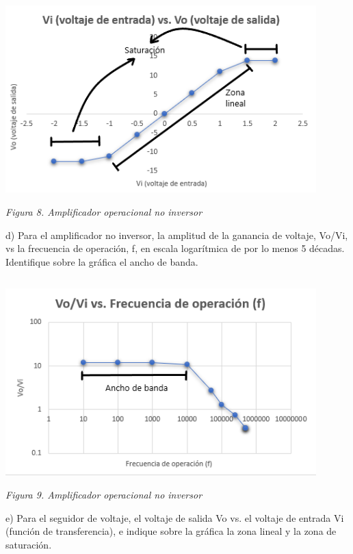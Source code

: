 \documentclass[12pt]{article}
\begin{document}
	\begin{center}
		\includegraphics[width=12cm,height=8cm]{Img/graf3}\\
		\textit{Figura 8. Amplificador operacional no inversor}\\
	\end{center}
	
	d) Para el amplificador no inversor, la amplitud de la ganancia de voltaje, Vo/Vi, vs la frecuencia de operación, f, en escala logarítmica de por lo menos 5 décadas. Identifique sobre la gráfica el ancho de banda.\\
	
	\begin{center}
		\includegraphics[width=12cm,height=8cm]{Img/graf4}\\
		\textit{Figura 9. Amplificador operacional no inversor}\\
	\end{center}
	
	\vspace{3cm}
	e) Para el seguidor de voltaje, el voltaje de salida Vo vs. el voltaje de entrada Vi (función de transferencia), e indique sobre la gráfica la zona lineal y la zona de saturación.\\
	
\end{document}
